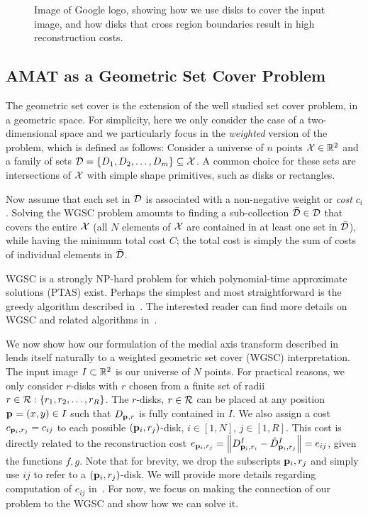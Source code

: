 \documentclass[10pt,twocolumn,letterpaper]{article}
\begin{document}
\begin{figure}[ht]
\caption{Image of Google logo, showing how we use disks to cover the input image, and how disks that cross region boundaries result
in high reconstruction costs.}
\label{fig:google}
\end{figure}


\subsection{AMAT as a Geometric Set Cover Problem}\label{sec:method:amat-wgsc}
The geometric set cover is the extension of the well studied set cover problem, in a geometric space.
For simplicity, here we only consider the case of a two-dimensional space and we particularly focus in the 
\emph{weighted} version of the problem, which is defined as follows:
Consider a universe of $n$ points $\mathcal{X} \in \mathbb{R}^2$ and a family of sets 
$\mathcal{D} = \{D_1,D_2,\ldots,D_m\} \subseteq \mathcal{X}$. 
A common choice for these sets are intersections of $\mathcal{X}$ with simple shape primitives, such as disks or rectangles.

Now assume that each set in $\mathcal{D}$ is associated with a non-negative weight or \emph{cost} $c_i$.
Solving the WGSC problem amounts to finding a sub-collection $\bar{\mathcal{D}} \in \mathcal{D}$ that covers the entire $\mathcal{X}$
(all $N$ elements of $\mathcal{X}$ are contained in at least one set in $\bar{\mathcal{D}}$), while having the minimum
total cost $C$; the total cost is simply the sum of costs of individual elements in $\bar{\mathcal{D}}$.

WGSC is a strongly NP-hard problem for which polynomial-time approximate solutions (PTAS) exist.
Perhaps the simplest and most straightforward is the greedy algorithm described in~\cite{vazirani2013approximation}. 
The interested reader can find more details on WGSC and related algorithms 
in~\cite{mustafa2015quasi,varadarajan2010weighted,har2012weighted,chan2012weighted}.

We now show how our formulation of the medial axis transform described in~ lends itself naturally to a 
weighted geometric set cover (WGSC) interpretation.
The input image $I\subset\mathbb{R}^2$ is our universe of $N$ points.
For practical reasons, we only consider $r$-disks with $r$ chosen from a finite set of radii $r\in\mathcal{R}:\{r_1,r_2,\ldots,r_R\}$.
The $r$-disks, $r\in\mathcal{R}$ can be placed at any position $\mathbf{p}_{}=(x,y)\in I$ such that $D_{\mathbf{p}_{},r}$ is fully contained in $I$.
We also assign a cost $c_{\mathbf{p}_{i},r_j} = c_{ij}$ to each possible $(\mathbf{p}_{i},r_j)$-disk, $i\in[1,N],\, j\in[1,R]$.
This cost is directly related to the reconstruction cost 
$e_{\mathbf{p}_{i},r_j}=\left \lVert D_{\mathbf{p}_{i},r_i}^I - \tilde{D}_{\mathbf{p}_{i},r_j}^I \right \rVert = e_{ij}$, given the functions $f,g$.
Note that for brevity, we drop the subscripts $\mathbf{p}_{i},r_j$ and simply use $ij$ to refer to a $(\mathbf{p}_{i},r_j)$-disk.
We will provide more details regarding computation of $e_{ij}$ in~.
For now, we focus on making the connection of our problem to the WGSC and show how we can solve it.
\end{document}
